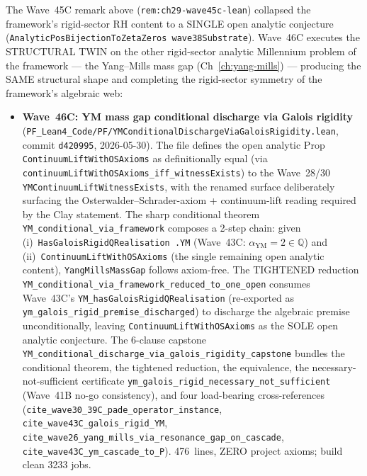\begin{remark}\label{rem:ch29-wave46c-lean}
The Wave~45C remark above (\texttt{rem:ch29-wave45c-lean}) collapsed the framework's rigid-sector RH content to a SINGLE open analytic conjecture (\texttt{AnalyticPosBijectionToZetaZeros wave38Substrate}). Wave~46C executes the STRUCTURAL TWIN on the other rigid-sector analytic Millennium problem of the framework --- the Yang--Mills mass gap (Ch~\ref{ch:yang-mills}) --- producing the SAME structural shape and completing the rigid-sector symmetry of the framework's algebraic web:
\begin{itemize}
  \item \textbf{Wave~46C: YM mass gap conditional discharge via Galois rigidity} (\texttt{PF\_Lean4\_Code/PF/YMConditionalDischargeViaGaloisRigidity.lean}, commit \texttt{d420995}, 2026-05-30). The file defines the open analytic Prop \texttt{ContinuumLiftWithOSAxioms} as definitionally equal (via \texttt{continuumLiftWithOSAxioms\_iff\_witnessExists}) to the Wave~28/30 \texttt{YMContinuumLiftWitnessExists}, with the renamed surface deliberately surfacing the Osterwalder--Schrader-axiom + continuum-lift reading required by the Clay statement. The sharp conditional theorem \texttt{YM\_conditional\_via\_framework} composes a 2-step chain: given (i)~\texttt{HasGaloisRigidQRealisation .YM} (Wave~43C: $\alpha_{\mathrm{YM}} = 2 \in \mathbb{Q}$) and (ii)~\texttt{ContinuumLiftWithOSAxioms} (the single remaining open analytic content), \texttt{YangMillsMassGap} follows axiom-free. The TIGHTENED reduction \texttt{YM\_conditional\_via\_framework\_reduced\_to\_one\_open} consumes Wave~43C's \texttt{YM\_hasGaloisRigidQRealisation} (re-exported as \texttt{ym\_galois\_rigid\_premise\_discharged}) to discharge the algebraic premise unconditionally, leaving \texttt{ContinuumLiftWithOSAxioms} as the SOLE open analytic conjecture. The 6-clause capstone \texttt{YM\_conditional\_discharge\_via\_galois\_rigidity\_capstone} bundles the conditional theorem, the tightened reduction, the equivalence, the necessary-not-sufficient certificate \texttt{ym\_galois\_rigid\_necessary\_not\_sufficient} (Wave~41B no-go consistency), and four load-bearing cross-references (\texttt{cite\_wave30\_39C\_pade\_operator\_instance}, \texttt{cite\_wave43C\_galois\_rigid\_YM}, \texttt{cite\_wave26\_yang\_mills\_via\_resonance\_gap\_on\_cascade}, \texttt{cite\_wave43C\_ym\_cascade\_to\_P}). 476~lines, ZERO project axioms; build clean 3233 jobs.

\end{itemize}
\end{remark}
